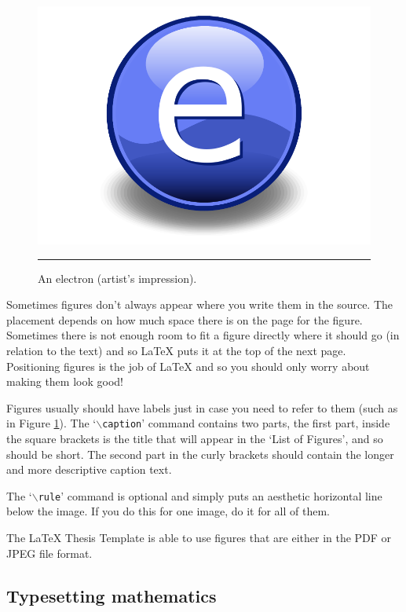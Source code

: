 \begin{figure}[htbp]
	\centering
		\includegraphics{./Figures/Electron.pdf}
		\rule{35em}{0.5pt}
	\caption[An Electron]{An electron (artist's impression).}
	\label{fig:Electron}
\end{figure}

Sometimes figures don't always appear where you write them in the source. The placement depends on how much space there is on the page for the figure. Sometimes there is not enough room to fit a figure directly where it should go (in relation to the text) and so \LaTeX{} puts it at the top of the next page. Positioning figures is the job of \LaTeX{} and so you should only worry about making them look good!

Figures usually should have labels just in case you need to refer to them (such as in Figure \ref{fig:Electron}). The `$\backslash$\texttt{caption}' command contains two parts, the first part, inside the square brackets is the title that will appear in the `List of Figures', and so should be short. The second part in the curly brackets should contain the longer and more descriptive caption text.

The `$\backslash$\texttt{rule}' command is optional and simply puts an aesthetic horizontal line below the image. If you do this for one image, do it for all of them.

The \LaTeX{} Thesis Template is able to use figures that are either in the PDF or JPEG file format.

\subsection{Typesetting mathematics}

